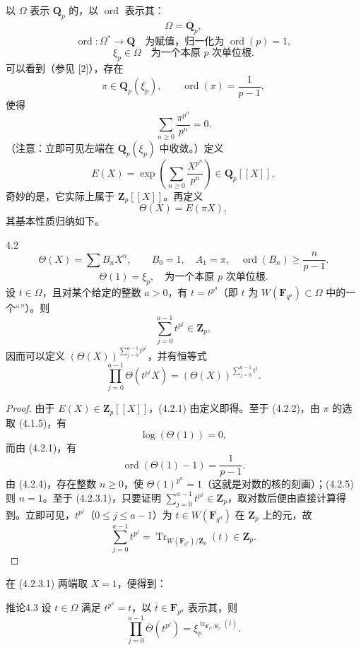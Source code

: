 以 $\Omega$ 表示 $\mathbf Q_p$ 的，以 $\operatorname{ord}$ 表示其：
\[
\Omega=\overline{\mathbf Q}_p,\tag{4.1.1}
\]
\[
\operatorname{ord}:\Omega^*\longrightarrow\mathbf Q
\quad\text{为赋值，归一化为 }\operatorname{ord}(p)=1,\tag{4.1.2}
\]
\[
\xi_p\in\Omega\quad\text{为一个本原 }p\text{ 次单位根}.\tag{4.1.3}
\]
可以看到（参见 [2]），存在
\[
\pi\in\mathbf Q_p(\xi_p),\qquad\operatorname{ord}(\pi)=\frac1{p-1},\tag{4.1.4}
\]
使得
\[
\sum_{n\ge0}\frac{\pi^{p^n}}{p^n}=0.\tag{4.1.5}
\]
（注意：立即可见左端在 $\mathbf Q_p(\xi_p)$ 中收敛。）定义 
\[
E(X)=\exp\left(\sum_{n\ge0}\frac{X^{p^n}}{p^n}\right)\in\mathbf Q_p[[X]],\tag{4.1.6}
\]
奇妙的是，它实际上属于 $\mathbf Z_p[[X]]$。再定义
\[
\Theta(X)=E(\pi X),\tag{4.1.7}
\]
其基本性质归纳如下。
\begin{SGAresult}{}{4.2}
\[
\Theta(X)=\sum B_nX^n,\qquad B_0=1,\quad A_1=\pi,\quad
\operatorname{ord}(B_n)\ge\frac n{p-1}.\tag{4.2.1}
\]
\[
\Theta(1)=\xi_p,\quad\text{为一个本原 }p\text{ 次单位根}.\tag{4.2.2}
\]
设 $t\in\Omega$，且对某个给定的整数 $a>0$，有 $t=t^{p^a}$（即 $t$ 为 $W(\mathbf F_{q^a})\subset\Omega$ 中的一个“”）。则
\[
\sum_{j=0}^{a-1}t^{p^j}\in\mathbf Z_p,\tag{4.2.3}
\]
因而可以定义 $(\Theta(X))^{\sum_{j=0}^{a-1}t^{p^j}}$，并有恒等式
\[
\prod_{j=0}^{a-1}\Theta(t^{p^j}X)
=(\Theta(X))^{\sum_{j=0}^{a-1}t^j}.\tag{4.2.3.1}
\]
\end{SGAresult}
\begin{proof}
由于 $E(X)\in\mathbf Z_p[[X]]$，(4.2.1) 由定义即得。至于 (4.2.2)，由 $\pi$ 的选取 (4.1.5)，有
\[
\log(\Theta(1))=0,\tag{4.2.4}
\]
而由 (4.2.1)，有
\[
\operatorname{ord}(\Theta(1)-1)=\frac1{p-1}.\tag{4.2.5}
\]
由 (4.2.4)，存在整数 $n\ge0$，使 $\Theta(1)^{p^n}=1$（这就是对数的核的刻画）；(4.2.5) 则 $n=1$。至于 (4.2.3.1)，只要证明 $\sum_{j=0}^{a-1}t^{p^j}\in\mathbf Z_p$，取对数后便由直接计算得到。立即可见，$t^{p^j}$（$0\le j\le a-1$）为 $t\in W(\mathbf F_{q^a})$ 在 $\mathbf Z_p$ 上的元，故
\[
\sum_{j=0}^{a-1}t^{p^j}=\operatorname{Tr}_{W(\mathbf F_{q^a})/\mathbf Z_p}(t)\in\mathbf Z_p.
\]
\end{proof}
在 (4.2.3.1) 两端取 $X=1$，便得到：
\begin{SGAresult}{推论}{4.3}
设 $t\in\Omega$ 满足 $t^{p^a}=t$，以 $\bar t\in\mathbf F_{p^a}$ 表示其，则
\[
\prod_{j=0}^{a-1}\Theta(t^{p^j})
=\xi_p^{\operatorname{tr}_{\mathbf F_{p^a}/\mathbf F_p}(\bar t)}.\tag{4.3.1}
\]
\end{SGAresult}
